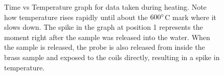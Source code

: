 \documentclass{article}
\begin{document}
\begin{figure}[H]

\caption{Time vs Temperature graph for data taken during heating. Note how temperature rises rapidly until about the $600\degree$C mark where it slows down. The spike in the graph at position 1 represents the moment right after the sample was released into the water. When the sample is released, the probe is also released from inside the brass sample and exposed to the coils directly, resulting in a spike in temperature.}
\end{figure}
\end{document}
